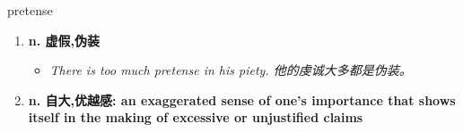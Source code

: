 
\begin{frame}
{\huge pretense}
\begin{center}
\begin{enumerate}\Large
  \item \textbf{n. 虚假,伪装}
  \begin{itemize}
    \item \em{\Large{There is too much pretense in his piety. 他的虔诚大多都是伪装。}}
  \end{itemize}
  \item \textbf{n. 自大,优越感: an exaggerated sense of one's importance that shows itself in the making of excessive or unjustified claims}
\end{enumerate}
\end{center}
\end{frame}
